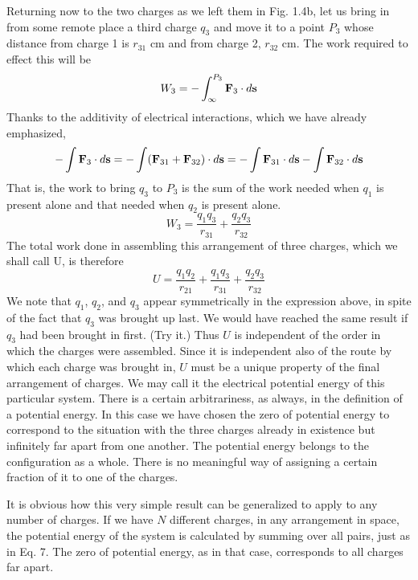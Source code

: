 Returning now to the two charges as we left them in Fig. 1.4b, let
us bring in from some remote place a third charge $q_3$ and move it to a
point $P_3$ whose distance from charge 1 is $r_{31}$ cm and from charge 2,
$r_{32}$ cm. The work required to effect this will be
\begin{equation}
  W_3 = -\int_\infty^{P_3} \mathbf{F}_3\cdot d\mathbf{s}
\end{equation}
Thanks to the additivity of electrical interactions, which we have
already emphasized,
\begin{equation}
  -\int \mathbf{F}_3\cdot d\mathbf{s} = - \int (\mathbf{F}_{31}+\mathbf{F}_{32})\cdot d\mathbf{s}
  = -\int \mathbf{F}_{31}\cdot d\mathbf{s} -\int \mathbf{F}_{32}\cdot d\mathbf{s}
\end{equation}
That is, the work to bring $q_3$ to $P_3$ is the sum of the work needed when
$q_1$ is present alone and that needed when $q_2$ is present alone.
\begin{equation}
  W_3 = \frac{q_1q_3}{r_{31}}+\frac{q_2q_3}{r_{32}}
\end{equation}
The total work done in assembling this arrangement of three charges,
which we shall call U, is therefore
\begin{equation}
  U = \frac{q_1q_2}{r_{21}}+\frac{q_1q_3}{r_{31}}+\frac{q_2q_3}{r_{32}}
\end{equation}
We note that $q_1$, $q_2$, and $q_3$ appear symmetrically in the expression
above, in spite of the fact that $q_3$ was brought up last. We would have
reached the same result if $q_3$ had been brought in first. (Try it.)
Thus $U$ is independent of the order in which the charges were assembled.
Since it is independent also of the route by which each charge
was brought in, $U$ must be a unique property of the final arrangement
of charges. We may call it the electrical potential energy of this particular
system. There is a certain arbitrariness, as always, in the definition
of a potential energy. In this case we have chosen the zero
of potential energy to correspond to the situation with the three
charges already in existence but infinitely far apart from one another.
The potential energy belongs to the configuration as a whole. There
is no meaningful way of assigning a certain fraction of it to one of the
charges.

It is obvious how this very simple result can be generalized to
apply to any number of charges. If we have $N$ different charges, in
any arrangement in space, the potential energy of the system is calculated
by summing over all pairs, just as in Eq. 7. The zero of
potential energy, as in that case, corresponds to all charges far apart.

